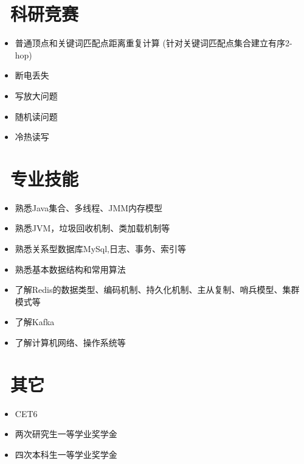 \documentclass{resume}
\begin{document}
\section{\faTrophy\ 科研竞赛}

\begin{itemize}
  \item 普通顶点和关键词匹配点距离重复计算 (针对关键词匹配点集合建立有序2-hop)
\end{itemize}
\begin{itemize}
  \item 断电丢失
  \item 写放大问题
  \item 随机读问题
  \item 冷热读写
\end{itemize}

\vspace{-1ex}

\section{\faCogs\ 专业技能}
\begin{itemize}[parsep=0.5ex]
  \item 熟悉Java集合、多线程、JMM内存模型
  \item 熟悉JVM，垃圾回收机制、类加载机制等
  \item 熟悉关系型数据库MySql,日志、事务、索引等
  \item 熟悉基本数据结构和常用算法
  \item 了解Redis的数据类型、编码机制、持久化机制、主从复制、哨兵模型、集群模式等
  \item 了解Kafka
  \item 了解计算机网络、操作系统等
\end{itemize}

\section{\faInfo\ 其它}
\begin{itemize}[parsep=0.5ex]
\item CET6
\item 两次研究生一等学业奖学金
\item 四次本科生一等学业奖学金

\end{itemize}


%
%
\end{document}

